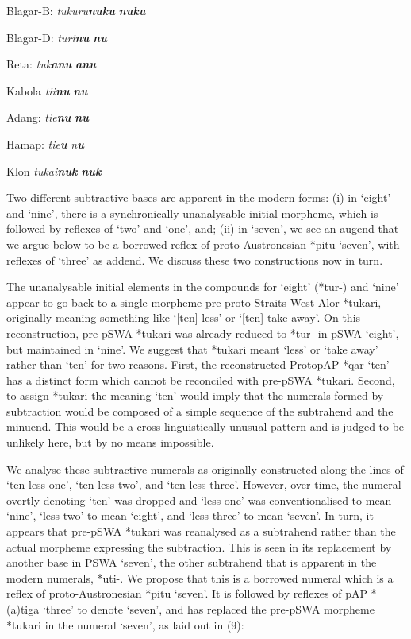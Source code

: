 {Blagar-B:  \textit{tukuru}\textbf{\textit{nuku}}      \textbf{\textit{nuku}}

Blagar-D:  \textit{turi}\textbf{\textit{nu}}         \textbf{\textit{nu}}

Reta:    \textit{tuk}\textbf{\textit{anu}}       \textbf{\textit{anu}}

Kabola   \textit{ti}\textit{{\textglotstop}i}\textbf{\textit{nu}}        \textbf{\textit{nu}}\textbf{}

Adang:    \textit{ti}\textit{{\textglotstop}e}\textbf{\textit{nu}}         \textbf{\textit{nu}}\textbf{}

Hamap:  \textit{tie}\textbf{\textit{u}}         \textit{n}\textbf{\textit{u}}\textbf{}

Klon     \textit{tukai}\textbf{\textit{nuk}}       \textbf{\textit{nuk}}
\z
\z

Two different subtractive bases are apparent in the modern forms: (i) in `eight' and `nine', there is a synchronically unanalysable initial morpheme, which is followed by reflexes of `two' and `one', and; (ii) in `seven', we see an augend that we argue below to be a borrowed reflex of proto-Austronesian *pitu `seven', with reflexes of `three' as addend. We discuss these two constructions now in turn.

The unanalysable initial elements in the compounds for `eight' (*tur-) and `nine' appear to go back to a single morpheme pre-proto-Straits West Alor *tukari, originally meaning something like `[ten] less' or `[ten] take away'. On this reconstruction, pre-pSWA *tukari was already reduced to *tur- in pSWA `eight', but maintained in `nine'. We suggest that *tukari meant `less' or `take away' rather than `ten' for two reasons. First, the reconstructed ProtopAP *qar `ten' \citep{HoltonEtAl2012} has a distinct form which cannot be reconciled with pre-pSWA *tukari. Second, to assign *tukari the meaning `ten' would imply that the numerals formed by subtraction would be composed of a simple sequence of the subtrahend and the minuend. This would be a cross-linguistically unusual pattern and is judged to be unlikely here, but by no means impossible.

We analyse these subtractive numerals as originally constructed along the lines of `ten less one', `ten less two', and `ten less three'. However, over time, the numeral overtly denoting `ten' was dropped and `less one' was conventionalised to mean `nine', `less two' to mean `eight', and `less three' to mean `seven'. In turn, it appears that pre-pSWA *tukari was reanalysed as a subtrahend rather than the actual morpheme expressing the subtraction. This is seen in its replacement by another base in PSWA `seven', the other subtrahend that is apparent in the modern numerals, *{\texthtb}uti-. We propose that this is a borrowed numeral which is a reflex of proto-Austronesian *pitu `seven'. It is followed by reflexes of pAP *(a)tiga `three' to denote `seven', and has replaced the pre-pSWA morpheme *tukari in the numeral `seven', as laid out in (9):

}
